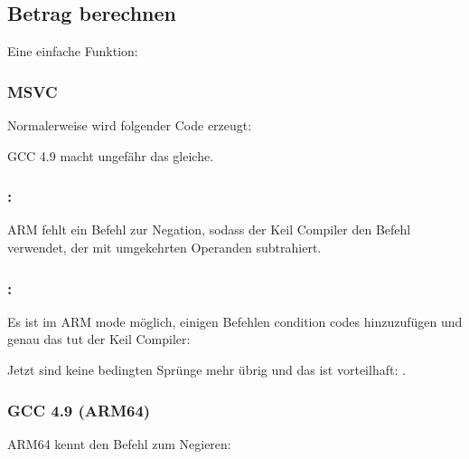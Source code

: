\subsection{Betrag berechnen}
\label{sec:abs}

Eine einfache Funktion:



\subsubsection{\Optimizing MSVC}

Normalerweise wird folgender Code erzeugt:



GCC 4.9 macht ungefähr das gleiche.

\subsubsection{\OptimizingKeilVI: \ThumbMode}



ARM fehlt ein Befehl zur Negation, sodass der Keil Compiler den  Befehl verwendet, der mit umgekehrten Operanden subtrahiert.

\subsubsection{\OptimizingKeilVI: \ARMMode}
Es ist im ARM mode möglich, einigen Befehlen condition codes hinzuzufügen und genau das tut der Keil Compiler:



Jetzt sind keine bedingten Sprünge mehr übrig und das ist vorteilhaft: .


\subsubsection{\NonOptimizing GCC 4.9 (ARM64)}


ARM64 kennt den Befehl  zum Negieren:



